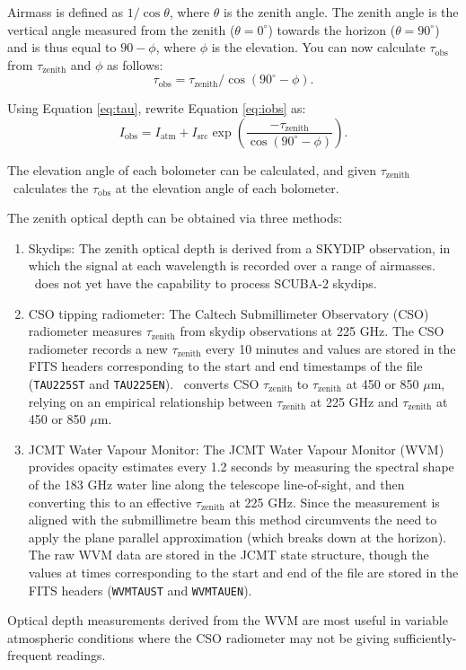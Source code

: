 \documentclass[oneside,11pt]{starlink}
\begin{document}
Airmass is defined as $1 / \cos \theta$, where $\theta$ is the zenith
angle. The zenith angle is the vertical angle measured from the zenith
($\theta = 0^\circ$) towards the horizon ($\theta = 90^\circ$) and is
thus equal to $90-\phi$, where $\phi$ is the elevation. You can now
calculate $\tau_{\textrm{obs}}$ from $\tau_{\textrm{zenith}}$ and $\phi$ as
follows:
\begin{equation}
\tau_{\textrm{obs}} = \tau_{\textrm{zenith}} / \cos(90^\circ - \phi ).
\label{eq:tau}
\end{equation}

Using Equation \ref{eq:tau}, rewrite Equation \ref{eq:iobs} as:
\begin{equation}
I_{\textrm{obs}} = I_{\textrm{atm}} + I_{\textrm{src}} \exp \left(
\frac{-\tau_{\textrm{zenith}}}{\cos(90^\circ-\phi)}\right).
\end{equation}

The elevation angle of each bolometer can be calculated, and given
$\tau_{\textrm{zenith}}$ \remsky\ calculates the $\tau_{\textrm{obs}}$ at the
elevation angle of each bolometer.

The zenith optical depth can be obtained via three methods:
\begin{enumerate}
\item Skydips: The zenith optical depth is derived from a SKYDIP
  observation, in which the signal at each wavelength is recorded over
  a range of airmasses. \SMURF\ does not yet have the capability to
  process SCUBA-2 skydips.

\item CSO tipping radiometer: The Caltech Submillimeter Observatory
  (CSO) radiometer measures $\tau_{\textrm{zenith}}$ from skydip
  observations at 225 GHz. The CSO radiometer records a new $\tau_{\textrm{zenith}}$ every 10 minutes and values are stored in the FITS
  headers corresponding to the start and end timestamps of the file
  (\texttt{TAU225ST} and \texttt{TAU225EN}). \SMURF\ converts CSO
  $\tau_{\textrm{zenith}}$ to $\tau_{\textrm{zenith}}$ at 450 or 850 $\mu$m,
  relying on an empirical relationship between $\tau_{\textrm{zenith}}$ at
  225 GHz and $\tau_{\textrm{zenith}}$ at 450 or 850 $\mu$m.

\item JCMT Water Vapour Monitor: The JCMT Water Vapour Monitor (WVM)
  provides opacity estimates every 1.2 seconds by measuring the
  spectral shape of the 183 GHz water line along the telescope
  line-of-sight, and then converting this to an effective $\tau_{\textrm{zenith}}$ at 225 GHz. Since the measurement is aligned with the
  submillimetre beam this method circumvents the need to apply the
  plane parallel approximation (which breaks down at the horizon). The
  raw WVM data are stored in the JCMT state structure, though the
  values at times corresponding to the start and end of the file are
  stored in the FITS headers (\texttt{WVMTAUST} and
  \texttt{WVMTAUEN}).
\end{enumerate}
Optical depth measurements derived from the WVM are most useful in
variable atmospheric conditions where the CSO radiometer may not be
giving sufficiently-frequent readings.
\end{document}

